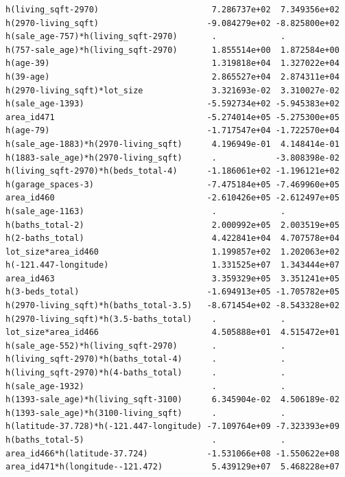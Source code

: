 \documentclass[
]{article}
\begin{document}
\begin{verbatim}
h(living_sqft-2970)                       7.286737e+02  7.349356e+02
h(2970-living_sqft)                      -9.084279e+02 -8.825800e+02
h(sale_age-757)*h(living_sqft-2970)       .             .           
h(757-sale_age)*h(living_sqft-2970)       1.855514e+00  1.872584e+00
h(age-39)                                 1.319818e+04  1.327022e+04
h(39-age)                                 2.865527e+04  2.874311e+04
h(2970-living_sqft)*lot_size              3.321693e-02  3.310027e-02
h(sale_age-1393)                         -5.592734e+02 -5.945383e+02
area_id471                               -5.274014e+05 -5.275300e+05
h(age-79)                                -1.717547e+04 -1.722570e+04
h(sale_age-1883)*h(2970-living_sqft)      4.196949e-01  4.148414e-01
h(1883-sale_age)*h(2970-living_sqft)      .            -3.808398e-02
h(living_sqft-2970)*h(beds_total-4)      -1.186061e+02 -1.196121e+02
h(garage_spaces-3)                       -7.475184e+05 -7.469960e+05
area_id460                               -2.610426e+05 -2.612497e+05
h(sale_age-1163)                          .             .           
h(baths_total-2)                          2.000992e+05  2.003519e+05
h(2-baths_total)                          4.422841e+04  4.707578e+04
lot_size*area_id460                       1.199857e+02  1.202063e+02
h(-121.447-longitude)                     1.331525e+07  1.343444e+07
area_id463                                3.359329e+05  3.351241e+05
h(3-beds_total)                          -1.694913e+05 -1.705782e+05
h(2970-living_sqft)*h(baths_total-3.5)   -8.671454e+02 -8.543328e+02
h(2970-living_sqft)*h(3.5-baths_total)    .             .           
lot_size*area_id466                       4.505888e+01  4.515472e+01
h(sale_age-552)*h(living_sqft-2970)       .             .           
h(living_sqft-2970)*h(baths_total-4)      .             .           
h(living_sqft-2970)*h(4-baths_total)      .             .           
h(sale_age-1932)                          .             .           
h(1393-sale_age)*h(living_sqft-3100)      6.345904e-02  4.506189e-02
h(1393-sale_age)*h(3100-living_sqft)      .             .           
h(latitude-37.728)*h(-121.447-longitude) -7.109764e+09 -7.323393e+09
h(baths_total-5)                          .             .           
area_id466*h(latitude-37.724)            -1.531066e+08 -1.550622e+08
area_id471*h(longitude--121.472)          5.439129e+07  5.468228e+07
                                                                    

\end{verbatim}
\end{document}
